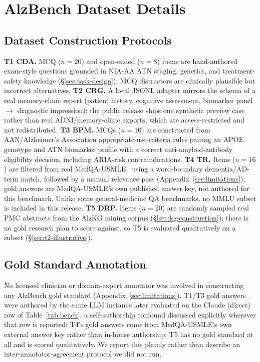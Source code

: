 \documentclass{article}
\begin{document}
\newpage
\section{AlzBench Dataset Details}
\label{app:bench-details}

\subsection{Dataset Construction Protocols}
\label{app:dataset-construction}
\textbf{T1 CDA.} MCQ ($n{=}20$) and open-ended ($n{=}8$) items are hand-authored exam-style questions grounded in NIA-AA ATN staging, genetics, and treatment-safety knowledge (\S\ref{sec:task-design}); MCQ distractors are clinically plausible but incorrect alternatives.
\textbf{T2 CRG.} A local JSONL adapter mirrors the schema of a real memory-clinic report (patient history, cognitive assessment, biomarker panel $\to$ diagnostic impression); the public release ships one synthetic preview case rather than real ADNI/memory-clinic exports, which are access-restricted and not redistributed.
\textbf{T3 BPM.} MCQs ($n{=}10$) are constructed from AAN/Alzheimer's Association appropriate-use-criteria rules pairing an APOE genotype and ATN biomarker profile with a correct anti-amyloid-antibody eligibility decision, including ARIA-risk contraindications.
\textbf{T4 TR.} Items ($n{=}16$) are filtered from real MedQA-USMLE~\citep{jin2021medqa} using a word-boundary dementia/AD-term match, followed by a manual relevance pass (Appendix~\ref{sec:limitations}); gold answers are MedQA-USMLE's own published answer key, not authored for this benchmark. Unlike some general-medicine QA benchmarks, no MMLU subset is included in this release.
\textbf{T5 DRP.} Items ($n{=}20$) are randomly sampled real PMC abstracts from the AlzKG mining corpus (\S\ref{sec:kg-construction}); there is no gold research plan to score against, so T5 is evaluated qualitatively on a subset (\S\ref{sec:t2-illustrative}).

\subsection{Gold Standard Annotation}
\label{app:gold-standard}
No licensed clinician or domain-expert annotator was involved in constructing any AlzBench gold standard (Appendix~\ref{sec:limitations}). T1/T3 gold answers were authored by the same LLM instance later evaluated on the Claude (direct) row of Table~\ref{tab:bench}, a self-authorship confound discussed explicitly wherever that row is reported; T4's gold answers come from MedQA-USMLE's own external answer key rather than in-house authorship; T5 has no gold standard at all and is scored qualitatively. We report this plainly rather than describe an inter-annotator-agreement protocol we did not run.
\end{document}
